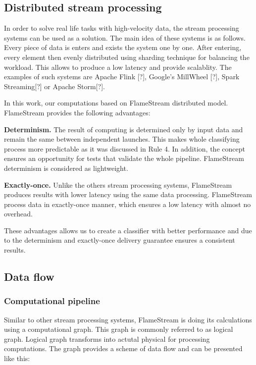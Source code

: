 
\subsection{Distributed stream processing}

In order to solve real life tasks with high-velocity data, the stream processing systems can be used as a solution. The main idea of these systems is as follows. Every piece of data is enters and exists the system one by one. After entering, every element then evenly distributed using sharding technique for balancing the workload. This allows to produce a low latency and provide scalablity. The examples of such systems are Apache Flink [?], Google's MillWheel [?], Spark Streaming[?] or Apache Storm[?].

In this work, our computations based on FlameStream \cite{kuralenok2018flamestream} distributed model. FlameStream provides the following advantages:

\textbf{Determinism.} The result of computing is determined only by input data and remain the same between independent launches. This makes whole classifying process more predictable as it was discussed in \cite{stonebraker20058} Rule 4. In addition, the concept ensures an opportunity for tests that validate the whole pipeline. FlameStream determinism is considered as lightweight.

\textbf{Exactly-once.} Unlike the others stream processing systems, FlameStream produces results with lower latency using the same data processing. FlameStream process data in exactly-once manner, which ensures a low latency with almost no overhead.

These advantages allows us to create a classifier with better performance and due to the determinism and exactly-once delivery guarantee ensures a consistent results.

\subsection{Data flow}

\subsubsection{Computational pipeline}

Similar to other stream processing systems, FlameStream is doing its calculations using a computational graph. This graph is  commonly referred to as logical graph. Logical graph transforms into actutal physical for processing computations. The graph provides a scheme of data flow and can be presented like this:

